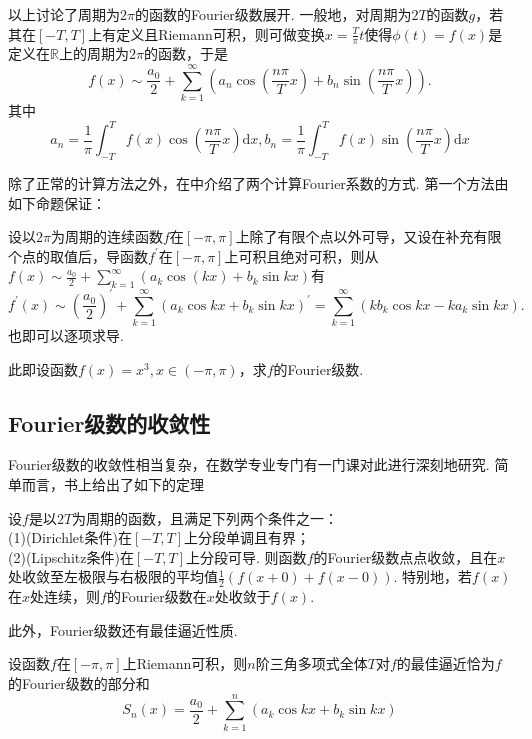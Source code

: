\documentclass{ctexart}
\begin{document}
以上讨论了周期为$2\pi$的函数的Fourier级数展开. 一般地，对周期为$2T$的函数$g$，若其在$[-T,T]$上有定义且Riemann可积，则可做变换$x=\frac{T}{\pi}t$使得$\phi(t)=f(x)$是定义在$\mathbb{R}$上的周期为$2\pi$的函数，于是
$$f(x)\sim \frac{a_{0}}{2}+\sum_{k=1}^{\infty}{\left(a_{n}\cos{(\frac{n\pi}{T}x)}+b_{n}\sin{(\frac{n\pi}{T}x)}\right)}.$$
其中
$$a_{n}=\frac{1}{\pi}\int_{-T}^{T}{f(x)\cos{(\frac{n\pi}{T}x)}\mathrm{d}x},b_{n}=\frac{1}{\pi}\int_{-T}^{T}{f(x)\sin{(\frac{n\pi}{T}x)}\mathrm{d}x}$$

除了正常的计算方法之外，在\cite[第十五章]{XHM}中介绍了两个计算Fourier系数的方式. 第一个方法由如下命题保证： 
\begin{theorem}
设以$2\pi$为周期的连续函数$f$在$[-\pi,\pi]$上除了有限个点以外可导，又设在补充有限个点的取值后，导函数$f^{\prime}$在$[-\pi,\pi]$上可积且绝对可积，则从$f(x)\sim\frac{a_{0}}{2}+\sum_{k=1}^{\infty}{(a_{k}\cos{(kx)}+b_{k}\sin{kx})}$有
$$f^{\prime}(x)\sim\left(\frac{a_{0}}{2}\right)^{\prime}+\sum_{k=1}^{\infty}{(a_{k}\cos{kx}+b_{k}\sin{kx})^{\prime}}=\sum_{k=1}^{\infty}{(kb_{k}\cos{kx}-ka_{k}\sin{kx})}.$$
也即可以逐项求导.
\end{theorem}

\begin{example}
此即\cite[例题15.1.2]{XHM}设函数$f(x)=x^{3},x\in(-\pi,\pi)$，求$f$的Fourier级数.
\end{example}

\subsection{Fourier级数的收敛性}
Fourier级数的收敛性相当复杂，在数学专业专门有一门课对此进行深刻地研究. 简单而言，书上给出了如下的定理
\begin{theorem}
设$f$是以$2T$为周期的函数，且满足下列两个条件之一：\\
(1)(Dirichlet条件)在$[-T,T]$上分段单调且有界；\\
(2)(Lipschitz条件)在$[-T,T]$上分段可导.
则函数$f$的Fourier级数点点收敛，且在$x$处收敛至左极限与右极限的平均值$\frac{1}{2}(f(x+0)+f(x-0))$. 特别地，若$f(x)$在$x$处连续，则$f$的Fourier级数在$x$处收敛于$f(x)$.
\end{theorem}

此外，Fourier级数还有最佳逼近性质. 
\begin{theorem}
设函数$f$在$[-\pi,\pi]$上Riemann可积，则$n$阶三角多项式全体$T$对$f$的最佳逼近恰为$f$的Fourier级数的部分和
$$S_{n}(x)=\frac{a_{0}}{2}+\sum_{k=1}^{n}{(a_{k}\cos{kx}+b_{k}\sin{kx})}$$
\end{theorem}
\end{document}

